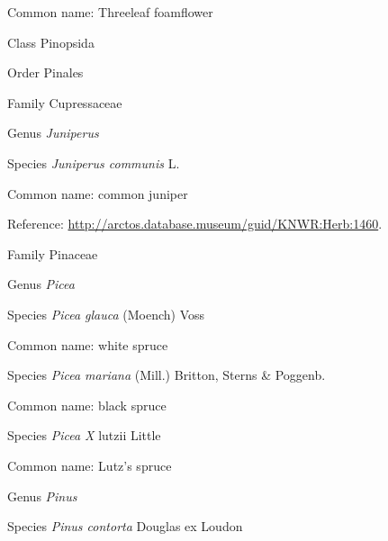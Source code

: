 \documentclass[9pt, article]{memoir}
\begin{document}
\begin{multicols}{2}
Common name: Threeleaf foamflower

\vspace{6pt}\noindent\hspace{12pt}Class Pinopsida


\vspace{6pt}\noindent\hspace{18pt}Order Pinales


\vspace{6pt}\noindent\hspace{24pt}Family Cupressaceae


\vspace{6pt}\noindent\hspace{30pt}Genus \textit{Juniperus}


\vspace{6pt}\noindent\hspace{36pt}Species \textit{Juniperus communis} L.


Common name: common juniper

Reference: 
\url{http://arctos.database.museum/guid/KNWR:Herb:1460}.

\vspace{6pt}\noindent\hspace{24pt}Family Pinaceae


\vspace{6pt}\noindent\hspace{30pt}Genus \textit{Picea}


\vspace{6pt}\noindent\hspace{36pt}Species \textit{Picea glauca} (Moench) Voss


Common name: white spruce

\vspace{6pt}\noindent\hspace{36pt}Species \textit{Picea mariana} (Mill.) Britton, Sterns \& Poggenb.


Common name: black spruce

\vspace{6pt}\noindent\hspace{36pt}Species \textit{Picea X} lutzii Little


Common name: Lutz's spruce

\vspace{6pt}\noindent\hspace{30pt}Genus \textit{Pinus}


\vspace{6pt}\noindent\hspace{36pt}Species \textit{Pinus contorta} Douglas ex Loudon



\end{multicols}
\end{document}
